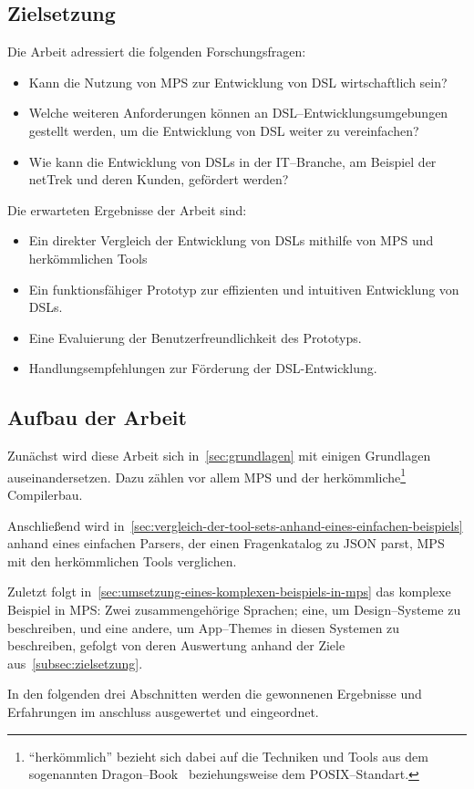\subsection{Zielsetzung}\label{subsec:zielsetzung}
Die Arbeit adressiert die folgenden Forschungsfragen:
\begin{itemize}
    \item Kann die Nutzung von \ac{MPS} zur Entwicklung von \ac{DSL} wirtschaftlich sein?
    \item Welche weiteren Anforderungen können an \ac{DSL}--Entwicklungsumgebungen gestellt werden, um die Entwicklung von \ac{DSL} weiter zu vereinfachen?
    \item Wie kann die Entwicklung von \acp{DSL} in der \acs{IT}--Branche, am Beispiel der \ac{netTrek} und deren Kunden, gefördert werden?
\end{itemize}
Die erwarteten Ergebnisse der Arbeit sind:
\begin{itemize}
    \item Ein direkter Vergleich der Entwicklung von \acp{DSL} mithilfe von \ac{MPS} und herkömmlichen Tools
    \item Ein funktionsfähiger Prototyp zur effizienten und intuitiven Entwicklung von \acp{DSL}.
    \item Eine Evaluierung der Benutzerfreundlichkeit des Prototyps.
    \item Handlungsempfehlungen zur Förderung der DSL-Entwicklung.
\end{itemize}

\subsection{Aufbau der Arbeit}\label{subsec:aufbau-der-arbeit}
Zunächst wird diese Arbeit sich in~\autoref{sec:grundlagen} mit einigen Grundlagen auseinandersetzen.
Dazu zählen vor allem \ac{MPS} und der herkömmliche\footnote{\enquote{herkömmlich} bezieht sich dabei auf die Techniken und Tools aus dem sogenannten Dragon--Book~\autocite{aho-2006} beziehungsweise dem \acs{POSIX}--Standart.} Compilerbau.

Anschließend wird in~\autoref{sec:vergleich-der-tool-sets-anhand-eines-einfachen-beispiels} anhand eines einfachen Parsers, der einen Fragenkatalog zu \ac{JSON} parst, \ac{MPS} mit den herkömmlichen Tools verglichen.

Zuletzt folgt in~\autoref{sec:umsetzung-eines-komplexen-beispiels-in-mps} das komplexe Beispiel in \ac{MPS}: Zwei zusammengehörige Sprachen; eine, um Design--Systeme zu beschreiben, und eine andere, um App--Themes in diesen Systemen zu beschreiben, gefolgt von deren Auswertung anhand der Ziele aus~\autoref{subsec:zielsetzung}.

In den folgenden drei Abschnitten werden die gewonnenen Ergebnisse und Erfahrungen im anschluss ausgewertet und eingeordnet.
